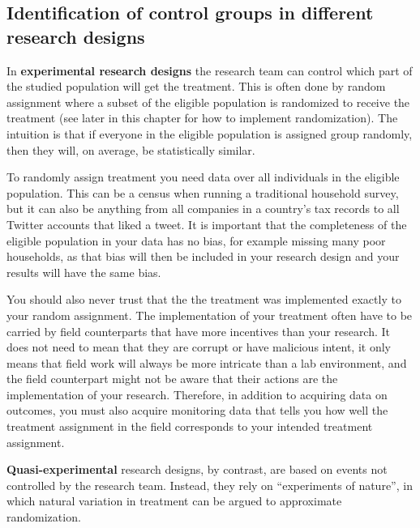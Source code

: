 \subsection{Identification of control groups in different research designs}


In \textbf{experimental research designs} the research team can control which part of the studied population will get the treatment. 
This is often done by random assignment
where a subset of the eligible population is randomized to receive the treatment (see later in this chapter for how to implement randomization). 
The intuition is that if everyone in the eligible population is assigned group randomly, then they will, on average, be statistically similar.

To randomly assign treatment you need data over all individuals in the eligible population. 
This can be a census when running a traditional household survey, 
but it can also be anything from all companies in a country's tax records
to all Twitter accounts that liked a tweet.
It is important that the completeness of the eligible population in your data has no bias, 
for example missing many poor households, 
as that bias will then be included in your research design and your results will have the same bias.

You should also never trust that the the treatment was implemented exactly to your random assignment.
The implementation of your treatment often have to be carried by field counterparts
that have more incentives than your research.
It does not need to mean that they are corrupt or have malicious intent, 
it only means that field work will always be more intricate than a lab environment, 
and the field counterpart might not be aware that their actions are the implementation of your research.
Therefore, in addition to acquiring data on outcomes,
you must also acquire monitoring data that tells you how well the treatment assignment in the field
corresponds to your intended treatment assignment.



\textbf{Quasi-experimental} research designs,
by contrast, are based on events not controlled by the research team. Instead, they rely on ``experiments of nature'',
in which natural variation in treatment can be argued to approximate randomization. 

